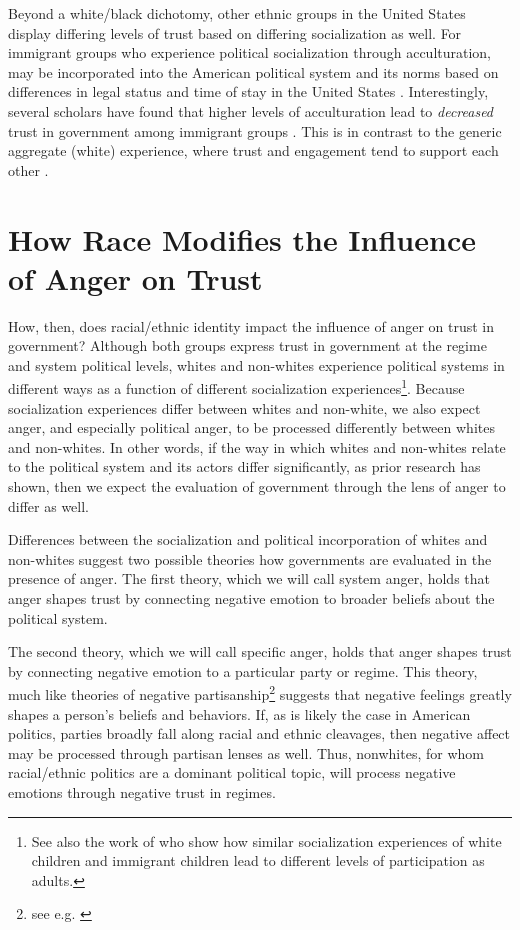 \documentclass[12t, letterpaper]{article}
\begin{document}
Beyond a white/black dichotomy, other ethnic groups in the United States display differing levels of trust based on differing socialization as well. For immigrant groups who experience political socialization through acculturation, may be incorporated into the American political system and its norms based on differences in legal status and time of stay in the United States \citep{uslaner2003}. Interestingly, several scholars have found that higher levels of acculturation lead to \textit{decreased} trust in government among immigrant groups \citep{abrajano2010,michelson2001}. This is in contrast to the generic aggregate (white) experience, where trust and engagement tend to support each other \citep{uslaner2005}. 

\section{How Race Modifies the Influence of Anger on Trust}
\label{sec:theory}

How, then, does racial/ethnic identity impact the influence of anger on trust in government? Although both groups express trust in government at the regime and system political levels, whites and non-whites experience political systems in different ways as a function of different socialization experiences\footnote{See also the work of \citet{humphries2013} who show how similar socialization experiences of white children and immigrant children lead to different levels of participation as adults.}. Because socialization experiences differ between whites and non-white, we also expect anger, and especially political anger, to be processed differently between whites and non-whites. In other words, if the way in which whites and non-whites relate to the political system and its actors differ significantly, as prior research has shown, then we expect the evaluation of government through the lens of anger to differ as well.

Differences between the socialization and political incorporation of whites and non-whites suggest two possible theories how governments are evaluated in the presence of anger. The first theory, which we will call system anger, holds that anger shapes trust by connecting negative emotion to broader beliefs about the political system. 

The second theory, which we will call specific anger, holds that anger shapes trust by connecting negative emotion to a particular party or regime. This theory, much like theories of negative partisanship\footnote{see e.g. \cite{abramowitz2016}} suggests that negative feelings greatly shapes a person's beliefs and behaviors. If, as is likely the case in American politics, parties broadly fall along racial and ethnic cleavages, then negative affect may be processed through partisan lenses as well. Thus, nonwhites, for whom racial/ethnic politics are a dominant political topic, will process negative emotions through negative trust in regimes.
\end{document}
